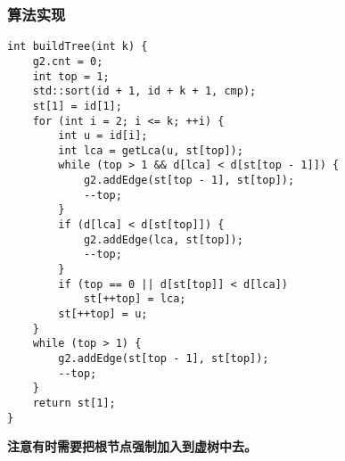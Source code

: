 \subsubsection{算法实现}

\begin{lstlisting}
int buildTree(int k) {
    g2.cnt = 0;
    int top = 1;
    std::sort(id + 1, id + k + 1, cmp);
    st[1] = id[1];
    for (int i = 2; i <= k; ++i) {
        int u = id[i];
        int lca = getLca(u, st[top]);
        while (top > 1 && d[lca] < d[st[top - 1]]) {
            g2.addEdge(st[top - 1], st[top]);
            --top;
        }
        if (d[lca] < d[st[top]]) {
            g2.addEdge(lca, st[top]);
            --top;
        }
        if (top == 0 || d[st[top]] < d[lca])
            st[++top] = lca;
        st[++top] = u;
    }
    while (top > 1) {
        g2.addEdge(st[top - 1], st[top]);
        --top;
    }
    return st[1];
}
\end{lstlisting}

{\bfseries 注意有时需要把根节点强制加入到虚树中去。}
